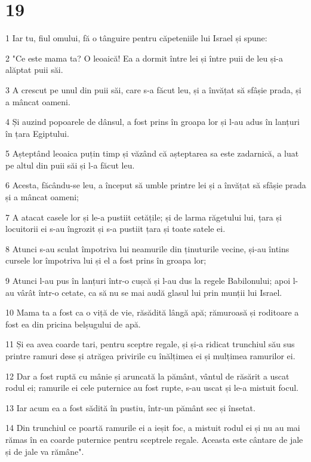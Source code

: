 \chapter{19}

\par 1 Iar tu, fiul omului, fă o tânguire pentru căpeteniile lui Israel și spune:
\par 2 "Ce este mama ta? O leoaică! Ea a dormit între lei și între puii de leu și-a alăptat puii săi.
\par 3 A crescut pe unul din puii săi, care s-a făcut leu, și a învățat să sfâșie prada, și a mâncat oameni.
\par 4 Și auzind popoarele de dânsul, a fost prins în groapa lor și l-au adus în lanțuri în țara Egiptului.
\par 5 Așteptând leoaica puțin timp și văzând că așteptarea sa este zadarnică, a luat pe altul din puii săi și l-a făcut leu.
\par 6 Acesta, făcându-se leu, a început să umble printre lei și a învățat să sfâșie prada și a mâncat oameni;
\par 7 A atacat casele lor și le-a pustiit cetățile; și de larma răgetului lui, țara și locuitorii ei s-au îngrozit și s-a pustiit țara și toate satele ei.
\par 8 Atunci s-au sculat împotriva lui neamurile din ținuturile vecine, și-au întins cursele lor împotriva lui și el a fost prins în groapa lor;
\par 9 Atunci l-au pus în lanțuri într-o cușcă și l-au dus la regele Babilonului; apoi l-au vârât într-o cetate, ca să nu se mai audă glasul lui prin munții lui Israel.
\par 10 Mama ta a fost ca o viță de vie, răsădită lângă apă; rămuroasă și roditoare a fost ea din pricina belșugului de apă.
\par 11 Și ea avea coarde tari, pentru sceptre regale, și și-a ridicat trunchiul său sus printre ramuri dese și atrăgea privirile cu înălțimea ei și mulțimea ramurilor ei.
\par 12 Dar a fost ruptă cu mânie și aruncată la pământ, vântul de răsărit a uscat rodul ei; ramurile ei cele puternice au fost rupte, s-au uscat și le-a mistuit focul.
\par 13 Iar acum ea a fost sădită în pustiu, într-un pământ sec și însetat.
\par 14 Din trunchiul ce poartă ramurile ei a ieșit foc, a mistuit rodul ei și nu au mai rămas în ea coarde puternice pentru sceptrele regale. Aceasta este cântare de jale și de jale va rămâne".

